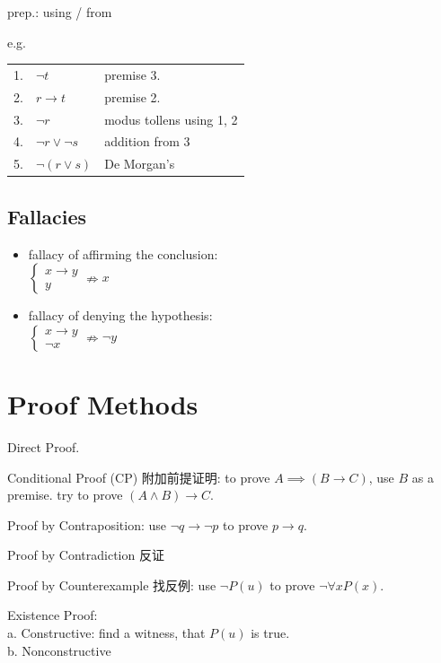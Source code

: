 \documentclass[12pt, a4paper, UTF8, openany]{ctexbook}
\begin{document}
        prep.: using / from

        e.g.
        \begin{longtable}[h]{l l l}
            1. & $\lnot t$ & premise 3. \\
            2. & $r \to t$ & premise 2. \\
            3. & $\lnot r$ & modus tollens using 1, 2 \\
            4. & $\lnot r \lor \lnot s$ & addition from 3 \\
            5. & $\lnot (r \lor s)$ & De Morgan's
        \end{longtable}

        \subsection{Fallacies}
        \begin{itemize}
            \item fallacy of affirming the conclusion: \\
                $\begin{cases}
                    x \to y \\ y
                \end{cases} \nRightarrow  x$
            \item fallacy of denying the hypothesis: \\
                $\begin{cases}
                    x \to y \\ \lnot x
                \end{cases} \nRightarrow  \lnot y$
        \end{itemize}
    
    \section{Proof Methods}
    Direct Proof.

    Conditional Proof (CP) 附加前提证明: to prove $A \implies (B \to C)$, use $B$ as a premise. 
    try to prove $(A \land B) \to C$.

    Proof by Contraposition: use $\lnot q \to \lnot p$ to prove $p \to q$.

    Proof by Contradiction 反证

    Proof by Counterexample 找反例: use $\lnot P(u)$ to prove $\lnot \forall xP(x)$.

    Existence Proof: \\
    a. Constructive: find a witness, that $P(u)$ is true. \\
    b. Nonconstructive
\end{document}
